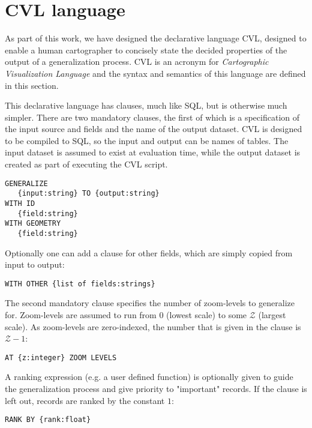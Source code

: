 \section{CVL language}
\label{sec:language}

As part of this work, we have designed the declarative language CVL, designed to enable a human cartographer to concisely state the decided properties of the output of a generalization process. CVL is an acronym for \emph{Cartographic Visualization Language} and the syntax and semantics of this language are defined in this section.

This declarative language has clauses, much like SQL, but is otherwise much simpler. There are two mandatory clauses, the first of which is a specification of the input source and fields and the name of the output dataset. CVL is designed to be compiled to SQL, so the input and output can be names of tables. The input dataset is assumed to exist at evaluation time, while the output dataset is created as part of executing the CVL script.

\begin{lstlisting}
GENERALIZE 
   {input:string} TO {output:string}
WITH ID
   {field:string}
WITH GEOMETRY 
   {field:string}
\end{lstlisting}

Optionally one can add a clause for other fields, which are simply copied from input to output:

\begin{lstlisting}
WITH OTHER {list of fields:strings}
\end{lstlisting}

The second mandatory clause specifies the number of zoom-levels to generalize for. Zoom-levels are assumed to run from 0 (lowest scale) to some $\mathcal{Z}$ (largest scale). As zoom-levels are zero-indexed, the number that is given in the clause is $\mathcal{Z}-1$:

\begin{lstlisting}
AT {z:integer} ZOOM LEVELS
\end{lstlisting}

A ranking expression (e.g. a user defined function) is optionally given to guide the generalization process and give priority to "important" records. If the clause is left out, records are ranked by the constant $1$:

\begin{lstlisting}
RANK BY {rank:float}
\end{lstlisting}

